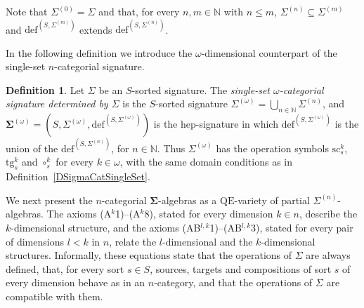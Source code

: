 \documentclass[a4paper, reqno
]{amsart}
\newcommand{\sig}[1]{\mathbf{#1}}             %
\newcommand{\QE}{\mathrm{QE}}
\newcommand{\src}{\mathrm{sc}}
\newcommand{\tgt}{\mathrm{tg}}
\theoremstyle{plain}
\theoremstyle{definition}
\newtheorem{definition}[theorem]{Definition}
\begin{document}
Note that $\Sigma^{(0)}=\Sigma$ and that, for every $n,m\in\mathbb{N}$ with $n\leq m$, $\Sigma^{(n)}\subseteq\Sigma^{(m)}$ and $\mathrm{def}^{(S,\Sigma^{(m)})}$ extends $\mathrm{def}^{(S,\Sigma^{(n)})}$.

In the following definition we introduce the $\omega$-dimensional counterpart of the single-set $n$-categorial signature.

\begin{definition}\label{DSigmaCatSingleSetOmega}
Let $\Sigma$ be an $S$-sorted signature.
The \emph{single-set $\omega$-categorial signature determined by $\Sigma$} is the $S$-sorted signature $\Sigma^{(\omega)}=\bigcup_{n\in\mathbb{N}}\Sigma^{(n)}$, and $\sig{\Sigma}^{(\omega)}=(S,\Sigma^{(\omega)},\mathrm{def}^{(S,\Sigma^{(\omega)})})$ is the hep-signature in which $\mathrm{def}^{(S,\Sigma^{(\omega)})}$ is the union of the $\mathrm{def}^{(S,\Sigma^{(n)})}$, for $n\in\mathbb{N}$.
Thus $\Sigma^{(\omega)}$ has the operation symbols $\src^{k}_{s}$, $\tgt^{k}_{s}$ and $\circ^{k}_{s}$ for every $k\in\omega$, with the same domain conditions as in Definition~\ref{DSigmaCatSingleSet}.
\end{definition}

We next present the $n$-categorial $\sig{\Sigma}$-algebras as a $\QE$-variety of partial $\Sigma^{(n)}$-algebras.
The axioms (A$^{k}$1)--(A$^{k}$8), stated for every dimension $k\in n$, describe the $k$-dimensional structure, and the axioms (AB$^{l,k}$1)--(AB$^{l,k}$3), stated for every pair of dimensions $l<k$ in $n$, relate the $l$-dimensional and the $k$-dimensional structures.
Informally, these equations state that the operations of $\Sigma$ are always defined, that, for every sort $s\in S$, sources, targets and compositions of sort $s$ of every dimension behave as in an $n$-category, and that the operations of $\Sigma$ are compatible with them.
\end{document}

